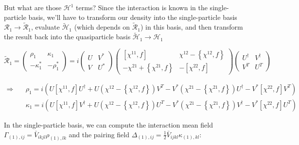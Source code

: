 \noindent But what are those $\mathcal{H}^{1}$ terms? Since the interaction is known in the single-particle basis, we'll have to transform our density into the single-particle basis $\mathcal{R}_1\rightarrow\mathcal{\tilde{R}}_1$, evaluate $\mathcal{\tilde{H}}_1$ (which depends on $\mathcal{\tilde{R}}_1$) in this basis, and then transform the result back into the quasiparticle basis $\mathcal{\tilde{H}}_1\rightarrow\mathcal{H}_1$

\begin{equation*}
\mathcal{\tilde{R}}_1 = \left(\begin{array}{cc}
\rho_1 & \kappa_1 \\
-\kappa_1^* & -\rho_1^*
\end{array}\right) = 
i\left(\begin{array}{cc}
U & V^* \\
V & U^*
\end{array}\right)
\left(\begin{array}{cc}
[\chi^{11},f] & \chi^{12}-\left\{\chi^{12},f\right\} \\
-\chi^{21}+\left\{\chi^{21},f\right\} & -[\chi^{22},f]
\end{array}\right)
\left(\begin{array}{cc}
U^\dagger & V^\dagger \\
V^T & U^T
\end{array}\right)
\end{equation*}

\begin{align*}
\Rightarrow \quad& \rho_1 = i\left(U[\chi^{11},f]U^\dagger + U\left(\chi^{12}-\left\{\chi^{12},f\right\}\right)V^T - V^*\left(\chi^{21}-\left\{\chi^{21},f\right\}\right)U^\dagger - V^*[\chi^{22},f]V^T \right) \\
& \kappa_1 = i\left(U[\chi^{11},f]V^\dagger + U\left(\chi^{12}-\left\{\chi^{12},f\right\}\right)U^T - V^*\left(\chi^{21}-\left\{\chi^{21},f\right\}\right)V^\dagger - V^*[\chi^{22},f]U^T \right)
\end{align*}

In the single-particle basis, we can compute the interaction mean field $\Gamma_{(1),ij} = \bar{V}_{ikjl}\rho_{(1),lk}$ and the pairing field $\Delta_{(1),ij} = \frac{1}{2}\bar{V}_{ijkl}\kappa_{(1),kl}$:

